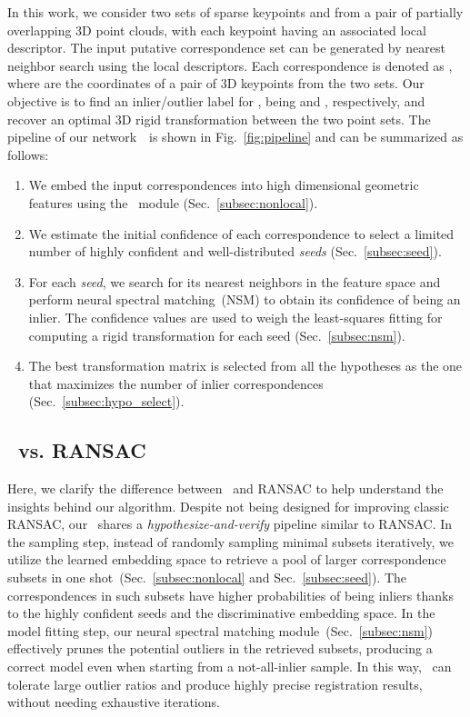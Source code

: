 In this work, we consider two sets of sparse keypoints  and  from a pair of partially overlapping 3D point clouds, {with each keypoint having} an associated local descriptor. 
The input putative correspondence set  can be generated by nearest neighbor search using the local descriptors. Each correspondence  is denoted as , where  are the coordinates of {a pair of 3D keypoints from the two sets.}
{Our objective is to find an inlier/outlier label for , being  and , respectively,}
and recover {an optimal 3D rigid} transformation  between the two point sets.
The pipeline of our network~\Name~is shown in Fig.~\ref{fig:pipeline} and can be summarized as follows:
\begin{enumerate}[itemsep=-1mm]
\item We embed the input correspondences into high dimensional geometric features using the \nonlocal~module
(Sec.~\ref{subsec:nonlocal}).
    \item We estimate the initial confidence  of each correspondence  to select a limited number of highly confident and well-distributed \textit{seeds} (Sec.~\ref{subsec:seed}).
\item For each \textit{seed}, we search for its  nearest neighbors in the feature space and perform neural spectral matching~(NSM) to obtain {its} confidence {of} being an inlier. The confidence values are used to {weigh} the least-squares fitting for computing a rigid transformation for each seed (Sec.~\ref{subsec:nsm}). 


\item The best transformation matrix is selected from all the hypotheses as the one that maximizes the number of inlier correspondences (Sec.~\ref{subsec:hypo_select}).
\end{enumerate}






\subsection{\Name~vs. RANSAC}
\label{sec:vs_ransac}


Here, we clarify the difference between \Name~and RANSAC {to help understand the insights behind our algorithm}.
{Despite} not being designed for improving
classic RANSAC, our \Name~shares {a} \textit{hypothesize-and-verify} pipeline {similar to RANSAC}. In the sampling step, instead of randomly sampling minimal subsets iteratively, we utilize the learned embedding space to retrieve a pool of larger correspondence subsets in one shot~(Sec.~\ref{subsec:nonlocal} and Sec.~\ref{subsec:seed}). {The correspondences in such subsets} have higher probabilities {of being} inliers {thanks to the highly confident seeds and the discriminative embedding space}. In the model fitting step, our neural spectral matching module~(Sec.~\ref{subsec:nsm}) effectively prunes the potential outliers in the retrieved subsets, producing a correct model even when starting from a not-all-inlier sample. In this way, \Name~can tolerate large outlier ratios and produce highly precise registration results, without needing exhaustive iterations. 




